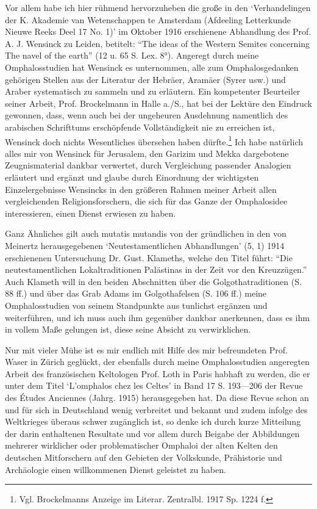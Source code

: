 \documentclass[a4paper, 11pt, oneside]{article}
\begin{document}
Vor allem habe ich hier rühmend hervorzuheben die große in den `Verhandelingen der K. Akademie van Wetenschappen te Amsterdam (Afdeeling Letterkunde Nieuwe Reeks Deel 17 No. 1)' im Oktober 1916 erschienene Abhandlung des Prof. A. J. Wensinck zu Leiden, betitelt: "`The ideas of the Western Semites concerning The navel of the earth"' (12 u. 65 S. Lex. 8°). Angeregt durch meine Omphalosstudien hat Wensinck es unternommen, alle zum Omphalosgedanken gehörigen Stellen aus der Literatur der Hebräer, Aramäer (Syrer usw.) und Araber systematisch zu sammeln und zu erläutern. Ein kompetenter Beurteiler seiner Arbeit, Prof. Brockelmann in Halle a./S., hat bei der Lektüre den Eindruck gewonnen, dass, wenn auch bei der ungeheuren Ausdehnung namentlich des arabischen Schrifttums erschöpfende Vollständigkeit nie zu erreichen ist, Wensinck doch nichts Wesentliches übersehen haben dürfte.\footnote{Vgl. Brockelmanns Anzeige im Literar. Zentralbl. 1917 Sp. 1224 f.} Ich habe natürlich alles mir von Wensinck für Jerusalem, den Garizim und Mekka dargebotene Zeugnismaterial dankbar verwertet, durch Vergleichung passender Analogien erläutert und ergänzt und glaube durch Einordnung der wichtigsten Einzelergebnisse Wensincks in den größeren Rahmen meiner Arbeit allen vergleichenden Religionsforschern, die sich für das Ganze der Omphalosidee interessieren, einen Dienst erwiesen zu haben.

Ganz Ähnliches gilt auch mutatis mutandis von der gründlichen in den von Meinertz herausgegebenen `Neutestamentlichen Abhandlungen' (5, 1) 1914 erschienenen Untersuchung Dr. Gust. Klameths, welche den Titel führt: "`Die neutestamentlichen Lokaltraditionen Palästinas in der Zeit vor den Kreuzzügen."' Auch Klameth will in den beiden Abschnitten über die Golgothatraditionen (S. 88 ff.) und über das Grab Adams im Golgothafelsen (S. 106 ff.) meine Omphalosstudien von seinem Standpunkte aus tunlichst ergänzen und weiterführen, und ich muss auch ihm gegenüber dankbar anerkennen, dass es ihm in vollem Maße gelungen ist, diese seine Absicht zu verwirklichen.

Nur mit vieler Mühe ist es mir endlich mit Hilfe des mir befreundeten Prof. Waser in Zürich geglückt, der ebenfalls durch meine Omphalosstudien angeregten Arbeit des französischen Keltologen Prof. Loth in Paris habhaft zu werden, die er unter dem Titel `L'omphalos chez les Celtes' in Band 17 S. 193---206 der Revue des Études Anciennes (Jahrg. 1915) herausgegeben hat. Da diese Revue schon an und für sich in Deutschland wenig verbreitet und bekannt und zudem infolge des Weltkrieges überaus schwer zugänglich ist, so denke ich durch kurze Mitteilung der darin enthaltenen Resultate und vor allem durch Beigabe der Abbildungen mehrerer wirklicher oder problematischer Omphaloi der alten Kelten den deutschen Mitforschern auf den Gebieten der Volkskunde, Prähistorie und Archäologie einen willkommenen Dienst geleistet zu haben.
\end{document}
